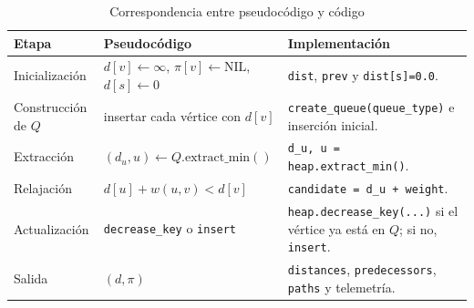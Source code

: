 \begin{table}[H]
    \centering
    \fontsize{9}{11}\selectfont
    \caption{Correspondencia entre pseudocódigo y código}
    \label{tab:pseudo_codigo}
    \begin{tabularx}{\textwidth}{@{}>{\raggedright\arraybackslash}p{3.6cm} >{\raggedright\arraybackslash}p{5.0cm} X@{}}
        \toprule
        \textbf{Etapa} & \textbf{Pseudocódigo} & \textbf{Implementación} \\
        \midrule
        Inicialización & $d[v]\leftarrow\infty$, $\pi[v]\leftarrow\text{NIL}$, $d[s]\leftarrow0$ & \texttt{dist}, \texttt{prev} y \texttt{dist[s]=0.0}. \\
        Construcción de $Q$ & insertar cada vértice con $d[v]$ & \texttt{create\_queue(queue\_type)} e inserción inicial. \\
        Extracción & $(d_u,u)\leftarrow Q.\text{extract\_min}()$ & \texttt{d\_u, u = heap.extract\_min()}. \\
        Relajación & $d[u]+w(u,v)<d[v]$ & \texttt{candidate = d\_u + weight}. \\
        Actualización & \texttt{decrease\_key} o \texttt{insert} & \texttt{heap.decrease\_key(...)} si el vértice ya está en $Q$; si no, \texttt{insert}. \\
        Salida & $(d,\pi)$ & \texttt{distances}, \texttt{predecessors}, \texttt{paths} y telemetría. \\
        \bottomrule
    \end{tabularx}
\end{table}
